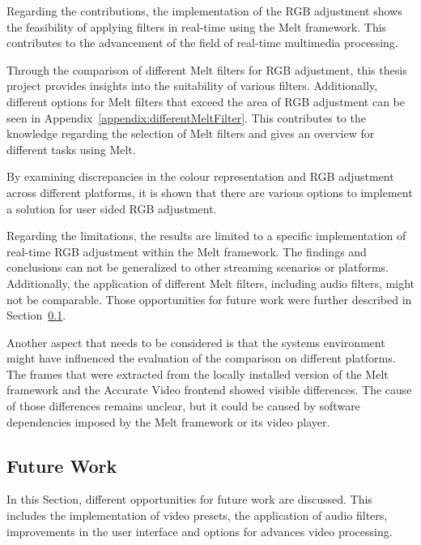 \documentclass[../MasterThesis.tex]{subfiles}
\begin{document}
Regarding the contributions, the implementation of the RGB adjustment shows the feasibility of applying filters in real-time using the Melt framework.
This contributes to the advancement of the field of real-time multimedia processing.


Through the comparison of different Melt filters for RGB adjustment, this thesis project provides insights into the suitability of various filters. Additionally, different options for Melt filters that exceed the area of RGB adjustment can be seen in Appendix~\ref{appendix:differentMeltFilter}.
This contributes to the knowledge regarding the selection of Melt filters and gives an overview for different tasks using Melt.


By examining discrepancies in the colour representation and RGB adjustment across different platforms, it is shown that there are various options to implement a solution for user sided RGB adjustment.


Regarding the limitations, the results are limited to a specific implementation of real-time RGB adjustment within the Melt framework. The findings and conclusions can not be generalized to other streaming scenarios or platforms. Additionally, the application of different Melt filters, including audio filters, might not be comparable. Those opportunities for future work were further described in Section~\ref{subsection:futurework}.


Another aspect that needs to be considered is that the systems environment might have influenced the evaluation of the comparison on different platforms. The frames that were extracted from the locally installed version of the Melt framework and the Accurate Video frontend showed visible differences. The cause of those differences remains unclear, but it could be caused by software dependencies imposed by the Melt framework or its video player.

	

	
	
	
	





\subsection{Future Work} \label{subsection:futurework}


In this Section, different opportunities for future work are discussed. This includes the implementation of video presets, the application of audio filters, improvements in the user interface and options for advances video processing.
\end{document}
